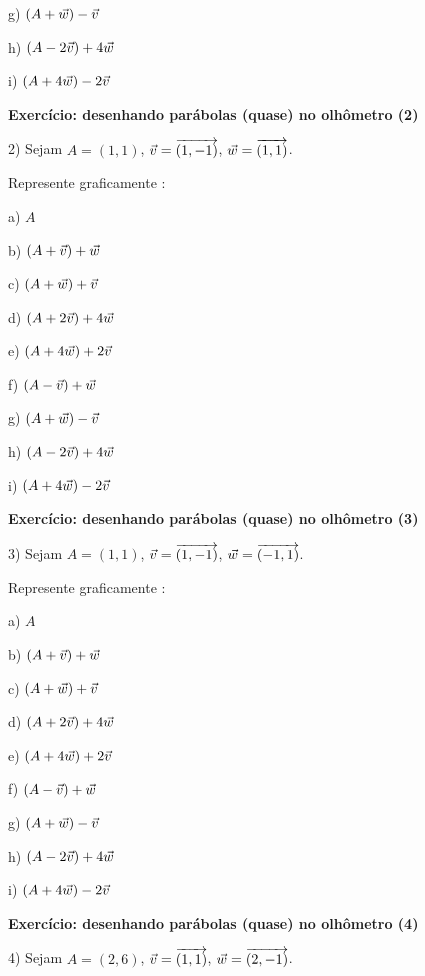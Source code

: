 \documentclass[oneside,12pt]{article}
\begin{document}
g) $(A+{\vec w})-{\vec v}$

h) $(A-2{\vec v})+4{\vec w}$

i) $(A+4{\vec w})-2{\vec v}$


\newpage


{\bf Exercício: desenhando parábolas (quase) no olhômetro (2)}

2) Sejam $A=(1,1)$, ${\vec v} = {\overrightarrow{(1,-1)}}$, ${\vec w} = {\overrightarrow{(1,1)}}$.

Represente graficamente :

a) $A$

b) $(A+{\vec v})+{\vec w}$

c) $(A+{\vec w})+{\vec v}$

d) $(A+2{\vec v})+4{\vec w}$

e) $(A+4{\vec w})+2{\vec v}$

f) $(A-{\vec v})+{\vec w}$

g) $(A+{\vec w})-{\vec v}$

h) $(A-2{\vec v})+4{\vec w}$

i) $(A+4{\vec w})-2{\vec v}$

\newpage


{\bf Exercício: desenhando parábolas (quase) no olhômetro (3)}

3) Sejam $A=(1,1)$, ${\vec v} = {\overrightarrow{(1,-1)}}$, ${\vec w} = {\overrightarrow{(-1,1)}}$.

Represente graficamente :

a) $A$

b) $(A+{\vec v})+{\vec w}$

c) $(A+{\vec w})+{\vec v}$

d) $(A+2{\vec v})+4{\vec w}$

e) $(A+4{\vec w})+2{\vec v}$

f) $(A-{\vec v})+{\vec w}$

g) $(A+{\vec w})-{\vec v}$

h) $(A-2{\vec v})+4{\vec w}$

i) $(A+4{\vec w})-2{\vec v}$


\newpage


{\bf Exercício: desenhando parábolas (quase) no olhômetro (4)}

4) Sejam $A=(2,6)$, ${\vec v} = {\overrightarrow{(1,1)}}$, ${\vec w} = {\overrightarrow{(2,-1)}}$.
\end{document}
